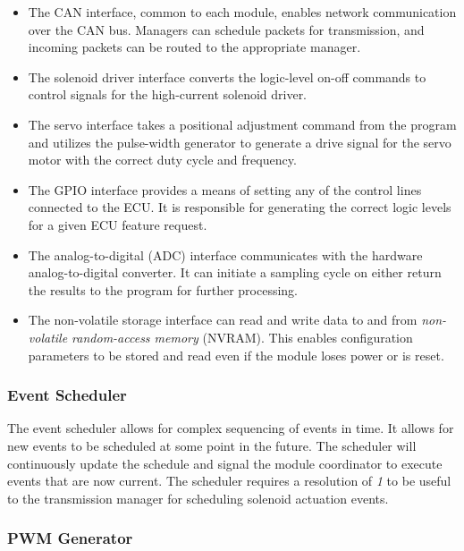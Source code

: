 \begin{itemize}

\item The CAN interface, common to each module, enables network communication over the CAN bus. Managers can schedule packets for transmission, and incoming packets can be routed to the appropriate manager.

\item The solenoid driver interface converts the logic-level on-off commands to control signals for the high-current solenoid driver.

\item The servo interface takes a positional adjustment command from the program and utilizes the pulse-width generator to generate a drive signal for the servo motor with the correct duty cycle and frequency.

\item The GPIO interface provides a means of setting any of the control lines connected to the ECU. It is responsible for generating the correct logic levels for a given ECU feature request.

\item The analog-to-digital (ADC) interface communicates with the hardware analog-to-digital converter. It can initiate a sampling cycle on either return the results to the program for further processing.

\item The non-volatile storage interface can read and write data to and from \emph{non-volatile random-access memory} (NVRAM). This enables configuration parameters to be stored and read even if the module loses power or is reset.

\end{itemize}

\subsubsection{Event Scheduler}

The event scheduler allows for complex sequencing of events in time. It allows for new events to be scheduled at some point in the future.
The scheduler will continuously update the schedule and signal the module coordinator to execute events that are now current. The scheduler requires a resolution of \emph{1}{\milli\second} to be useful to the transmission manager for scheduling solenoid actuation events.

\subsubsection{PWM Generator}

